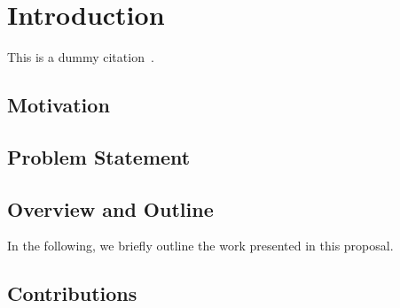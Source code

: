 
\chapter{Introduction}
\label{chap:introduction}

\lipsum

This is a dummy citation~\cite{dummy}.

\section{Motivation}
\label{sec:intro:motivation}


\section{Problem Statement}
\label{sec:intro:problem}

\section{Overview and Outline}
\label{sec:intro:overview}

In the following, we briefly outline the work presented in this proposal. 


\section{Contributions}
\label{sec:intro:contributions}

